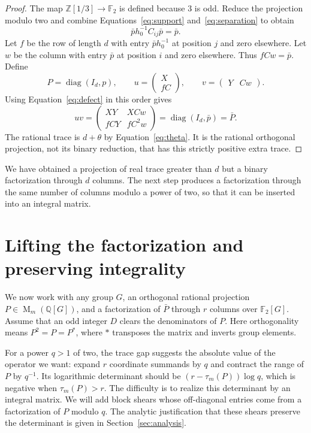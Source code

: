 \documentclass[11pt]{article}
\theoremstyle{remark}
\numberwithin{equation}{section}
\newcommand{\F}{\mathbb F}
\newcommand{\Z}{\mathbb Z}
\newcommand{\Q}{\mathbb Q}
\newcommand{\Mat}{\operatorname{M}}
\newcommand{\diag}{\operatorname{diag}}
\begin{document}
\begin{proof}
The map $\Z[1/3]\to\F_2$ is defined because $3$ is odd. Reduce
the projection modulo two and combine
Equations~\eqref{eq:support} and~\eqref{eq:separation} to obtain
\[
 \bar p h_0^{-1} C_{ij}\bar p=\bar p.
\]
Let $f$ be the row of length $d$ with entry $\bar p h_0^{-1}$
at position $j$ and zero elsewhere. Let $w$ be the column with
entry $\bar p$ at position $i$ and zero elsewhere. Thus
$fCw=\bar p$. Define
\[
 P=\diag(I_d,p),\qquad
 u=\begin{pmatrix}X\\fC\end{pmatrix},\qquad
 v=\begin{pmatrix}Y&Cw\end{pmatrix}.
\]
Using Equation~\eqref{eq:defect} in this order gives
\[
 uv=\begin{pmatrix}XY&XCw\\fCY&fC^2w\end{pmatrix}
   =\diag(I_d,\bar p)=\bar P.
\]
The rational trace is $d+\theta$ by Equation~\eqref{eq:theta}.
It is the rational orthogonal projection, not its binary reduction,
that has this strictly positive extra trace.
\end{proof}

We have obtained a projection of real trace greater than $d$ but a
binary factorization through $d$ columns. The next step produces
a factorization through the same number of columns modulo a power of two, so
that it can be inserted into an integral matrix.

\section{Lifting the factorization and preserving integrality}
\label{sec:lifting}

We now work with any group $G$, an orthogonal rational projection
$P\in\Mat_m(\Q[G])$, and a factorization of $\bar P$ through $r$
columns over $\F_2[G]$. Assume that an odd integer $D$ clears the
denominators of $P$. Here orthogonality means $P^2=P=P^*$, where
$*$ transposes the matrix and inverts group elements.

For a power $q>1$ of two, the trace gap suggests the absolute value
of the operator we want: expand $r$ coordinate summands by $q$ and
contract the range of $P$ by $q^{-1}$. Its
logarithmic determinant should be $(r-\tau_m(P))\log q$, which is
negative when $\tau_m(P)>r$. The difficulty is to realize this
determinant by an integral matrix. We will add block shears whose
off-diagonal entries come from a factorization of $P$ modulo $q$.
The analytic justification that these shears preserve the determinant
is given in Section~\ref{sec:analysis}.
\end{document}
